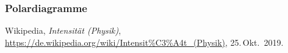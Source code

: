 \documentclass[german,  %
parskip=full,  %
]{scrartcl}
\begin{document}
\subsubsection{Polardiagramme}








    \begin{thebibliography}{9}
    Wikipedia,
    \emph{Intensität (Physik)},
    \url{https://de.wikipedia.org/wiki/Intensit%C3%A4t_(Physik)},
    25.\,Okt.~2019.
    \end{thebibliography}
\end{document}
